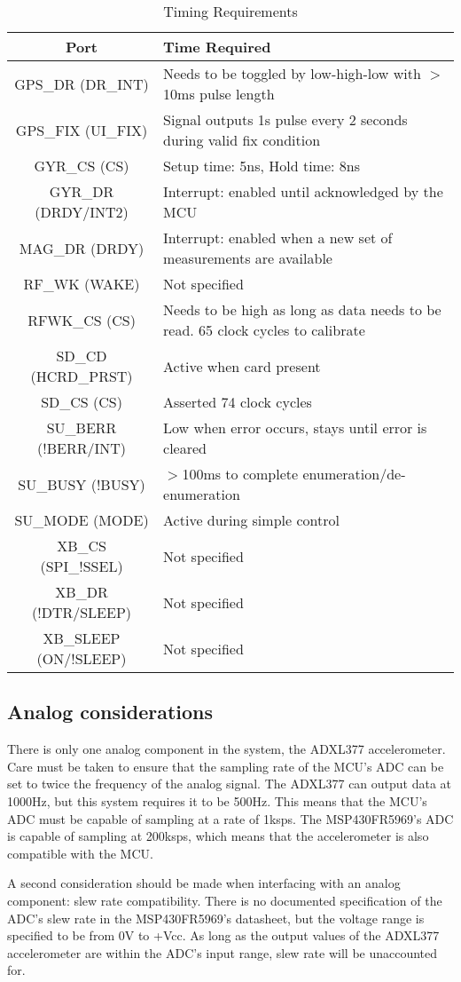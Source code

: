 \begin{table}[H]
  \centering
  \caption{Timing Requirements}
    \begin{tabular}{|c|p{3in}|}
    \hline
    \rowcolor{Gray}
    Port  & Time Required \\
    \hline \hline
    GPS\_DR (DR\_INT) & Needs to be toggled by low-high-low with $>$10ms pulse length \\ \hline
    GPS\_FIX (UI\_FIX) & Signal outputs 1s pulse every 2 seconds during valid fix condition \\ \hline
    GYR\_CS (CS) & Setup time: 5ns, Hold time: 8ns \\ \hline
    GYR\_DR (DRDY/INT2) & Interrupt: enabled until acknowledged by the MCU \\ \hline
    MAG\_DR (DRDY) & Interrupt: enabled when a new set of measurements are available \\ \hline
    RF\_WK (WAKE) & Not specified \\ \hline
    RFWK\_CS (CS) & Needs to be high as long as data needs to be read. 65 clock cycles to calibrate \\ \hline
    SD\_CD (HCRD\_PRST) & Active when card present \\ \hline
    SD\_CS (CS) & Asserted 74 clock cycles \\ \hline
    SU\_BERR (!BERR/INT) & Low when error occurs, stays until error is cleared \\ \hline
    SU\_BUSY (!BUSY) & $>$100ms to complete enumeration/de-enumeration \\ \hline
    SU\_MODE (MODE) & Active during simple control \\ \hline
    XB\_CS (SPI\_!SSEL) & Not specified \\ \hline
    XB\_DR (!DTR/SLEEP) & Not specified \\ \hline
    XB\_SLEEP (ON/!SLEEP) & Not specified \\ \hline
    \end{tabular}%
  \label{tab:timeReqs}%
\end{table}%


\subsection{Analog considerations}
There is only one analog component in the system, the ADXL377 accelerometer. Care must be taken to ensure that the sampling rate of the MCU's ADC can be set to twice the frequency of the analog signal. The ADXL377 can output data at 1000Hz, but this system requires it to be 500Hz. This means that the MCU's ADC must be capable of sampling at a rate of 1ksps. The MSP430FR5969's ADC is capable of sampling at 200ksps, which means that the accelerometer is also compatible with the MCU.

A second consideration should be made when interfacing with an analog component: slew rate compatibility. There is no documented specification of the ADC's slew rate in the MSP430FR5969's datasheet, but the voltage range is specified to be from 0V to +Vcc. As long as the output values of the ADXL377 accelerometer are within the ADC's input range, slew rate will be unaccounted for.


